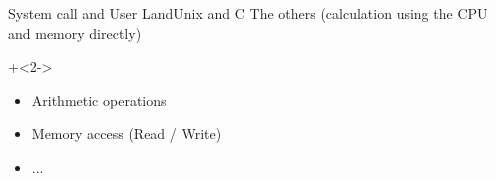 \begin{frame}{System call and User Land}{Unix and C}
    The others (calculation using the CPU and memory directly)
    \vspace{4ex}

    \onslide+<2->{
        \begin{itemize}
            \item Arithmetic operations
            \item Memory access (Read / Write)
            \item ...
        \end{itemize}
    }
\end{frame}
